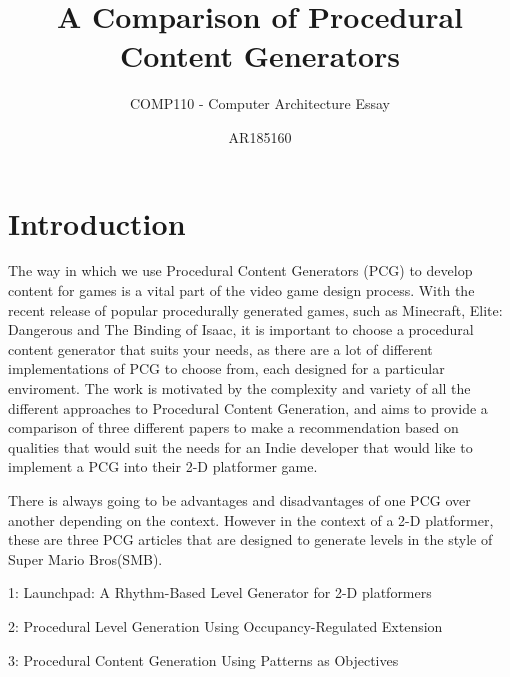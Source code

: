 \documentclass{scrartcl}
\title{A Comparison of Procedural Content Generators}
\subtitle{COMP110 - Computer Architecture Essay}
\author{AR185160}
\begin{document}
\maketitle


\section{Introduction}

The way in which we use Procedural Content Generators (PCG) to develop content for games is a vital part of the video game design process. With the recent release of popular procedurally generated games, such as Minecraft, Elite: Dangerous and The Binding of Isaac, it is important to choose a procedural content generator that suits your needs, as there are a lot of different implementations of PCG to choose from, each designed for a particular enviroment. The work is motivated by the complexity and variety of all the different approaches to Procedural Content Generation, and aims to provide a comparison of three different papers to make a recommendation based on qualities that would suit the needs for an Indie developer that would like to implement a PCG into their 2-D platformer game.

There is always going to be advantages and disadvantages of one PCG over another depending on the context. However in the context of a 2-D platformer, these are three PCG articles that are designed to generate levels in the style of Super Mario Bros(SMB).


1: Launchpad: A Rhythm-Based Level Generator for 2-D platformers\cite{smith2009}

2: Procedural Level Generation Using Occupancy-Regulated Extension \cite{mawhorter2010}

3: Procedural Content Generation Using Patterns as Objectives\cite{dahlskog2014} 

\end{document}
